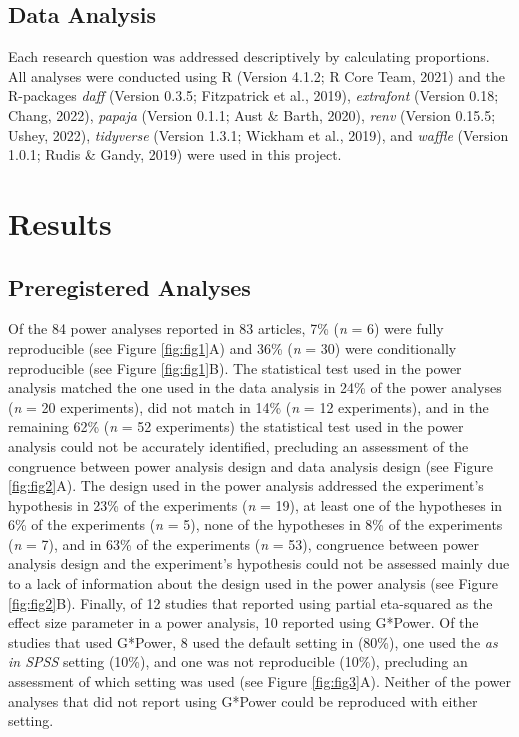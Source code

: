 \documentclass[
  doc, donotrepeattitle,floatsintext]{apa7}
\begin{document}
\hypertarget{data-analysis}{%
\subsection{Data Analysis}\label{data-analysis}}

Each research question was addressed descriptively by calculating proportions. All analyses were conducted using R (Version 4.1.2; R Core Team, 2021) and the R-packages \emph{daff} (Version 0.3.5; Fitzpatrick et al., 2019), \emph{extrafont} (Version 0.18; Chang, 2022), \emph{papaja} (Version 0.1.1; Aust \& Barth, 2020), \emph{renv} (Version 0.15.5; Ushey, 2022), \emph{tidyverse} (Version 1.3.1; Wickham et al., 2019), and \emph{waffle} (Version 1.0.1; Rudis \& Gandy, 2019) were used in this project.

\hypertarget{results}{%
\section{Results}\label{results}}

\hypertarget{preregistered-analyses}{%
\subsection{Preregistered Analyses}\label{preregistered-analyses}}

Of the 84 power analyses reported in 83 articles, 7\% (\emph{n} = 6) were fully reproducible (see Figure \ref{fig:fig1}A) and 36\% (\emph{n} = 30) were conditionally reproducible (see Figure \ref{fig:fig1}B). The statistical test used in the power analysis matched the one used in the data analysis in 24\% of the power analyses (\emph{n} = 20 experiments), did not match in 14\% (\emph{n} = 12 experiments), and in the remaining 62\% (\emph{n} = 52 experiments) the statistical test used in the power analysis could not be accurately identified, precluding an assessment of the congruence between power analysis design and data analysis design (see Figure \ref{fig:fig2}A). The design used in the power analysis addressed the experiment's hypothesis in 23\% of the experiments (\emph{n} = 19), at least one of the hypotheses in 6\% of the experiments (\emph{n} = 5), none of the hypotheses in 8\% of the experiments (\emph{n} = 7), and in 63\% of the experiments (\emph{n} = 53), congruence between power analysis design and the experiment's hypothesis could not be assessed mainly due to a lack of information about the design used in the power analysis (see Figure \ref{fig:fig2}B). Finally, of 12 studies that reported using partial eta-squared as the effect size parameter in a power analysis, 10 reported using G*Power. Of the studies that used G*Power, 8 used the default setting in (80\%), one used the \emph{as in SPSS} setting (10\%), and one was not reproducible (10\%), precluding an assessment of which setting was used (see Figure \ref{fig:fig3}A). Neither of the power analyses that did not report using G*Power could be reproduced with either setting.
\end{document}

